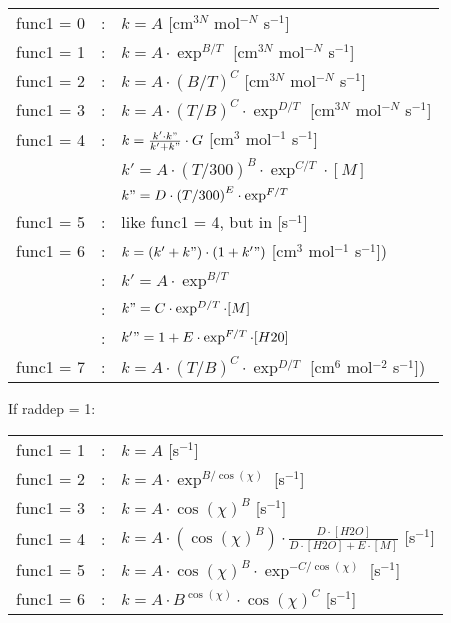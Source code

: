 \documentclass[twoside,11pt,fleqn,a4paper,english,openright]{report}
\begin{document}
				\begin{tabular}{lcl}
				func1 = 0 & : & $k=A$ [cm$^{3N}$ mol$^{-N}$ s$^{-1}$]  \\
				func1 = 1 & : & $k = A \cdot \exp^{B/T}$ [cm$^{3N}$ mol$^{-N}$ s$^{-1}$] \\
				func1 = 2 & : & $k = A \cdot (B/T)^C$ [cm$^{3N}$ mol$^{-N}$ s$^{-1}$] \\
				func1 = 3 & : & $k = A \cdot \left(T/B\right)^C \cdot \exp^{D/T}$ [cm$^{3N}$ mol$^{-N}$ s$^{-1}$]\\
				func1 = 4 & : & $k = \frac{k' \cdot k"}{k'+ k"}\cdot G $ [cm$^3$ mol$^{-1}$ s$^{-1}$]\\
				          &   & $k'= A \cdot \left(T/300\right)^B \cdot \exp^{C/T} \cdot [M]$\\
				          &   & $k"= D \cdot \left(T/300\right)^E \cdot \exp^{F/T}$\\
				func1 = 5 & : & like func1 = 4, but in [s$^{-1}$]\\
				func1 = 6 & : & $k = \left(k'+ k"\right)\cdot\left(1+k'"\right)$ [cm$^3$ mol$^{-1}$ s$^{-1}$])\\
						  & : & $k'= A \cdot \exp^{B/T}$\\
						  & : & $k"= C \cdot \exp^{D/T}\cdot[M]$\\
						  & : & $k'" = 1 + E \cdot \exp^{F/T}\cdot[H20]$\\
				func1 = 7 & : & $k = A \cdot \left(T/B\right)^C \cdot \exp^{D/T}$ [cm$^6$ mol$^{-2}$ s$^{-1}$])
				\end{tabular}
				$\,$ \\ $\,$ \\
				If raddep = 1:\\
				\begin{tabular}{lcl}
				func1 = 1 & : & $k=A$ [s$^{-1}$]\\
				func1 = 2 & : & $k=A \cdot \exp^{B / \cos(\chi)}$ [s$^{-1}$]\\
				func1 = 3 & : & $k=A \cdot \cos(\chi)^{B}$ [s$^{-1}$]\\
				func1 = 4 & : & $k=A \cdot (\cos(\chi)^B) \cdot \frac{D \cdot [H2O] }{ D \cdot [H2O] + E \cdot [M]}$ [s$^{-1}$]\\
				func1 = 5 & : & $k=A \cdot \cos(\chi)^B \cdot \exp^{-C /\cos(\chi)}$ [s$^{-1}$]\\
				func1 = 6 & : & $k=A \cdot B^{\cos(\chi)} \cdot \cos(\chi)^C$ [s$^{-1}$]\\
				\end{tabular}
				$\,$\\$\,$\\
\end{document}
